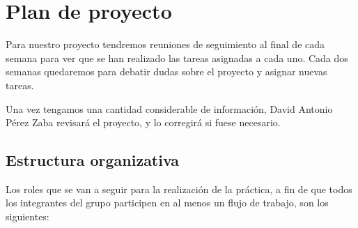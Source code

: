 \section{Plan de proyecto}

Para nuestro proyecto tendremos reuniones de seguimiento al final de cada semana para ver que se han realizado las tareas asignadas a cada uno. Cada dos semanas quedaremos para debatir dudas sobre el proyecto y asignar nuevas tareas.

Una vez tengamos una cantidad considerable de información, David Antonio Pérez Zaba revisará el proyecto, y lo corregirá si fuese necesario.

\subsection{Estructura organizativa}

Los roles que se van a seguir para la realización de la práctica, a fin de que todos los integrantes del grupo participen en al menos un flujo de trabajo, son los siguientes:

